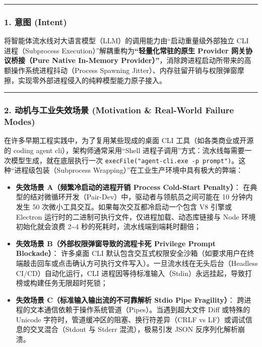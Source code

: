 \documentclass[
]{ctexart}
\providecommand{\tightlist}{%
  \setlength{\itemsep}{0pt}\setlength{\parskip}{0pt}}
\renewcommand{\_}{\discretionary{}{}{\textunderscore}}
\begin{document}
\begin{center}\rule{0.5\linewidth}{0.5pt}\end{center}

\subsubsection{1. 意图 (Intent)}\label{ux610fux56fe-intent-21}

将智能体流水线对大语言模型（LLM）的调用能力由``启动重量级外部独立 CLI
进程（Subprocess Execution）''解耦重构为\textbf{``轻量化常驻的原生
Provider 网关协议桥接（Pure Native In-Memory
Provider）''}，消除跨进程启动所带来的高额操作系统进程抖动（Process
Spawning
Jitter）、内存驻留开销与权限弹窗摩擦，实现零外部进程侵入的纯粹模型能力原子接入。

\begin{center}\rule{0.5\linewidth}{0.5pt}\end{center}

\subsubsection{2. 动机与工业失效场景 (Motivation \& Real-World Failure
Modes)}\label{ux52a8ux673aux4e0eux5de5ux4e1aux5931ux6548ux573aux666f-motivation-real-world-failure-modes-21}

在许多早期工程实践中，为了复用某些现成的桌面 CLI
工具（如各类商业或开源的 coding agent cli），架构师通常采用``Shell
进程子调用''方式：流水线每需要一次模型生成，就在底层执行一次
\texttt{execFile("agent-cli.exe\ -p\ \textquotesingle{}prompt\textquotesingle{}")}。这种``进程级包装（Subprocess
Wrapping）''在工业生产环境中具有极大的弊端：

\begin{itemize}
\tightlist
\item
  \textbf{失效场景 A（频繁冷启动的进程开销 Process Cold-Start
  Penalty）}：
  在典型的结对微循环开发（Pair-Dev）中，驱动者与领航员之间可能在 10
  分钟内发生 50 次微小工具交互。如果每次交互都冷启动一个包含 V8 引擎或
  Electron 运行时的二进制可执行文件，仅进程加载、动态库链接与 Node
  环境初始化就会浪费 2\textasciitilde4
  秒的死耗时，流水线端到端耗时翻倍；
\item
  \textbf{失效场景 B（外部权限弹窗导致的流程卡死 Privilege Prompt
  Blockade）}： 许多桌面 CLI
  默认包含交互式权限安全沙箱（如要求用户在终端敲击回车或点击确认方可执行文件写入）。一旦流水线在无头后台（Headless
  CI/CD）自动化运行，CLI
  进程因等待标准输入（Stdin）永远挂起，导致打榜或构建任务无限超时死锁；
\item
  \textbf{失效场景 C（标准输入输出流的不可靠解析 Stdio Pipe
  Fragility）}：
  跨进程的文本通信依赖于操作系统管道（Pipes）。当遇到超大文件 Diff
  或特殊的 Unicode 字符时，管道缓冲区的阻塞、换行符差异（CRLF vs
  LF）或调试信息的交叉混合（Stdout 与 Stderr 混流），极易引发 JSON
  反序列化解析崩溃。
\end{itemize}
\end{document}
